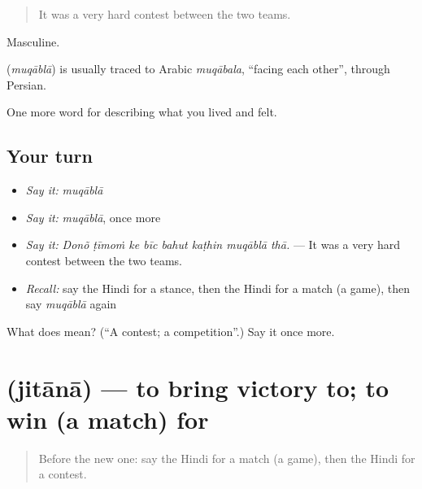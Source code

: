 \begin{quote}
It was a very hard contest between the two teams.
\end{quote}

Masculine.

\begin{cousinweb}
\textbf{} (\emph{muqāblā}) is usually traced to Arabic \emph{muqābala}, \textquotedblleft{}facing each other\textquotedblright{}, through Persian.
\end{cousinweb}

\begin{grammarlens}[title={What you've built}]
One more word for describing what you lived and felt.
\end{grammarlens}

\subsection*{Your turn}
\begin{itemize}
\raggedright
  \item \emph{Say it:} \emph{muqāblā}
  \item \emph{Say it:} \emph{muqāblā}, once more
  \item \emph{Say it:} \emph{Donõ ṭīmoṁ ke bīc bahut kaṭhin muqāblā thā.} — It was a very hard contest between the two teams.
  \item \emph{Recall:} say the Hindi for a stance, then the Hindi for a match (a game), then say \emph{muqāblā} again
\end{itemize}

\begin{tcolorbox}[breakable,colback=teal!4,colframe=teal!35!black,title={Before you move on}]
What does  mean? (\textquotedblleft{}A contest; a competition\textquotedblright{}.) Say it once more.
\end{tcolorbox}
\section[\texorpdfstring{\hi{जिताना} (jitānā)}{जिताना (jitānā)}]{ (jitānā) — to bring victory to; to win (a match) for}

\label{lesson:HI-C534-jitana}



\begin{quote}
Before the new one: say the Hindi for a match (a game), then the Hindi for a contest.
\end{quote}

